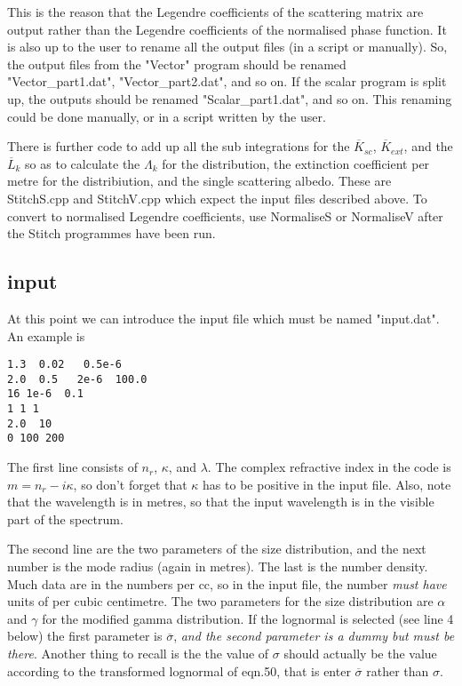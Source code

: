 \documentclass[12pt]{article}
\begin{document}
\begin{flushleft}
This is the reason that the Legendre coefficients of the scattering matrix
are output rather than the Legendre coefficients of the normalised phase function.
It is also up to the user to rename all the output files (in a script or manually).
So, the output files from the "Vector" program should be renamed "Vector\_part1.dat",
 "Vector\_part2.dat", and so on. If the scalar program is split up, the outputs
should be renamed "Scalar\_part1.dat", and so on. This renaming could be done
 manually, or in a script written by the user.

There is  further code to add up all the sub integrations for the ${\overline K_{sc}}$,
 ${\overline K_{ext}}$, 
and the ${\overline L_k}$ so as to calculate the $\Lambda_k$
for the distribution, the extinction coefficient per metre for the distribiution, and
the single scattering albedo. These are StitchS.cpp and StitchV.cpp which expect the 
input files described above. To convert to normalised Legendre coefficients, use NormaliseS or NormaliseV after the Stitch programmes have been run.


\subsection{input}
At this point we can introduce the input file which must be named "input.dat".
An example is
\begin{verbatim}
1.3  0.02   0.5e-6         
2.0  0.5   2e-6  100.0
16 1e-6  0.1
1 1 1
2.0  10
0 100 200
\end{verbatim}
The first line consists of $n_r$, $\kappa$, and $\lambda$. The complex
refractive index  in the code is $m=n_r-i \kappa$, so don't forget that $\kappa$ has
to be positive in the input file. Also, note that the wavelength is in metres,
so that the input wavelength is in the visible part of the spectrum.

The second line are the two  parameters of the size distribution,
and the next number is the mode radius (again in metres). The last is
the number density. Much data are in the numbers per cc, so in the input
file, the number {\it must have} units of per cubic centimetre.
 The two parameters for the 
size distribution are $\alpha$ and $\gamma$ for the modified gamma distribution.
If the lognormal is selected (see line 4 below) the first parameter is 
${\overline \sigma}$, {\it and the second parameter is a dummy but must be there}. 
Another thing to recall is the the value of $\sigma$ should actually be
the value according to the transformed lognormal of eqn.50, that is
enter ${\overline \sigma}$ rather than $\sigma$.  


\end{flushleft}
\end{document}
